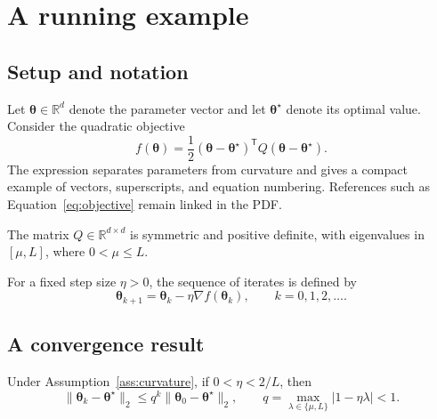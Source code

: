 \expandafter\documentclass\expandafter[\documentclassoptions]{article}
\begin{document}
\section{A running example}\label{sec:model}

\subsection{Setup and notation}

Let $\bm{\theta}\in\mathbb{R}^d$ denote the parameter vector and let
$\bm{\theta}^{\star}$ denote its optimal value. Consider the quadratic objective
\begin{equation}\label{eq:objective}
  f(\bm{\theta})
  = \frac{1}{2}(\bm{\theta}-\bm{\theta}^{\star})^{\mathsf{T}}
    Q(\bm{\theta}-\bm{\theta}^{\star}).
\end{equation}
The expression separates parameters from curvature and gives a compact example
of vectors, superscripts, and equation numbering. References such as
Equation~\eqref{eq:objective} remain linked in the PDF.

\begin{assumption}\label{ass:curvature}
The matrix $Q\in\mathbb{R}^{d\times d}$ is symmetric and positive definite,
with eigenvalues in $[\mu,L]$, where $0<\mu\leq L$.
\end{assumption}

\begin{definition}
For a fixed step size $\eta>0$, the sequence of iterates is defined by
\begin{equation}\label{eq:update}
  \bm{\theta}_{k+1}
  = \bm{\theta}_k-\eta\nabla f(\bm{\theta}_k),
  \qquad k=0,1,2,\ldots.
\end{equation}
\end{definition}

\subsection{A convergence result}

\begin{proposition}[Contraction]\label{prop:contraction}
Under Assumption~\ref{ass:curvature}, if $0<\eta<2/L$, then
\begin{equation}\label{eq:contraction}
  \lVert\bm{\theta}_{k}-\bm{\theta}^{\star}\rVert_2
  \leq q^k\lVert\bm{\theta}_{0}-\bm{\theta}^{\star}\rVert_2,
  \qquad q=\max_{\lambda\in\{\mu,L\}}|1-\eta\lambda|<1.
\end{equation}
\end{proposition}
\end{document}
